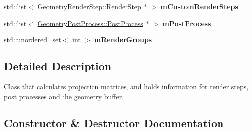 \begin{DoxyCompactItemize}
std\+::list$<$ \mbox{\hyperlink{class_geometry_engine_1_1_geometry_render_step_1_1_render_step}{Geometry\+Render\+Step\+::\+Render\+Step}} $\ast$ $>$ {\bfseries m\+Custom\+Render\+Steps}
\item 
\mbox{\label{class_geometry_engine_1_1_geometry_world_item_1_1_geometry_camera_1_1_camera_ad0878809e17d2f3c5e87743f856829c3}} 
std\+::list$<$ \mbox{\hyperlink{class_geometry_engine_1_1_geometry_post_process_1_1_post_process}{Geometry\+Post\+Process\+::\+Post\+Process}} $\ast$ $>$ {\bfseries m\+Post\+Process}
\item 
\mbox{\label{class_geometry_engine_1_1_geometry_world_item_1_1_geometry_camera_1_1_camera_af259aa784248dfb877f0d929e099f42f}} 
std\+::unordered\+\_\+set$<$ int $>$ {\bfseries m\+Render\+Groups}
\end{DoxyCompactItemize}


\subsection{Detailed Description}
Class that calculates projection matrices, and holds information for render steps, post processes and the geometry buffer. 

\subsection{Constructor \& Destructor Documentation}
\mbox{\label{class_geometry_engine_1_1_geometry_world_item_1_1_geometry_camera_1_1_camera_ad83b44011bb54382c3d99b2d936a27f9}} 
